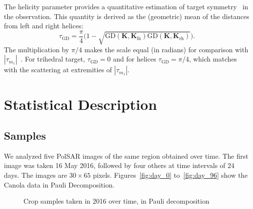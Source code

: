 \documentclass[journal]{IEEEtran}
\begin{document}
The helicity parameter provides a quantitative estimation of target symmetry~\cite{Touzi:TGARS:2007} in the observation. 
This quantity is derived as the (geometric) mean of the distances from left and right helices:
\begin{equation}
\tau_{\text{GD}} = \frac\pi4 \big(1 - \sqrt{\text{GD}(\bm{K},\bm{K}_{\text{lh}})\text{GD}(\bm{K},\bm{K}_{\text{rh}})}\big).
\end{equation}
The multiplication by $\pi/4$ makes the scale equal (in radians) for comparison with $|\tau_{m_1}|$~\cite{Touzi:TGARS:2007}. 
For trihedral target, $\tau_{\text{GD}} = 0$ and for helices $\tau_{\text{GD}} = \pi/4$, which matches with the scattering at extremities of $|\tau_{m_1}|$. 

\section{Statistical Description}

\subsection{Samples}

We analyzed five PolSAR images of the same region obtained over time.
The first image was taken 16 May 2016, followed by four others at time intervals of $24$ days. The images are $30 \times 65$ pixels.
Figures~\ref{fig:day_0} to~\ref{fig:day_96} show the Canola data in Pauli Decomposition. 

\begin{figure}[hbt]
  \centering
  \caption{Crop samples taken in 2016 over time, in Pauli decomposition}
  \label{fig:sample_images}
\end{figure}
\end{document}
